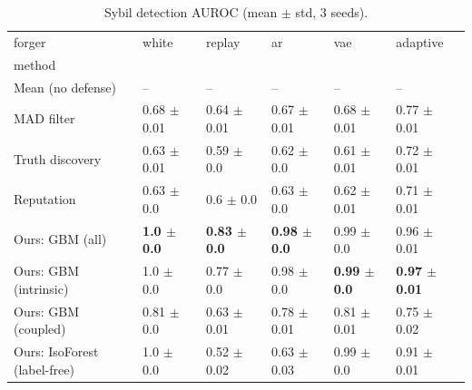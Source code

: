 \begin{table}
\caption{Sybil detection AUROC (mean $\pm$ std, 3 seeds).}
\label{tab:auroc}
\begin{tabular}{llllll}
\toprule
forger & white & replay & ar & vae & adaptive \\
method &  &  &  &  &  \\
\midrule
Mean (no defense) & -- & -- & -- & -- & -- \\
MAD filter & 0.68 $\pm$ 0.01 & 0.64 $\pm$ 0.01 & 0.67 $\pm$ 0.01 & 0.68 $\pm$ 0.01 & 0.77 $\pm$ 0.01 \\
Truth discovery & 0.63 $\pm$ 0.01 & 0.59 $\pm$ 0.0 & 0.62 $\pm$ 0.0 & 0.61 $\pm$ 0.01 & 0.72 $\pm$ 0.01 \\
Reputation & 0.63 $\pm$ 0.0 & 0.6 $\pm$ 0.0 & 0.63 $\pm$ 0.0 & 0.62 $\pm$ 0.01 & 0.71 $\pm$ 0.01 \\
Ours: GBM (all) & \textbf{1.0 $\pm$ 0.0} & \textbf{0.83 $\pm$ 0.0} & \textbf{0.98 $\pm$ 0.0} & 0.99 $\pm$ 0.0 & 0.96 $\pm$ 0.01 \\
Ours: GBM (intrinsic) & 1.0 $\pm$ 0.0 & 0.77 $\pm$ 0.0 & 0.98 $\pm$ 0.0 & \textbf{0.99 $\pm$ 0.0} & \textbf{0.97 $\pm$ 0.01} \\
Ours: GBM (coupled) & 0.81 $\pm$ 0.0 & 0.63 $\pm$ 0.01 & 0.78 $\pm$ 0.01 & 0.81 $\pm$ 0.01 & 0.75 $\pm$ 0.02 \\
Ours: IsoForest (label-free) & 1.0 $\pm$ 0.0 & 0.52 $\pm$ 0.02 & 0.63 $\pm$ 0.03 & 0.99 $\pm$ 0.0 & 0.91 $\pm$ 0.01 \\
\bottomrule
\end{tabular}
\end{table}
